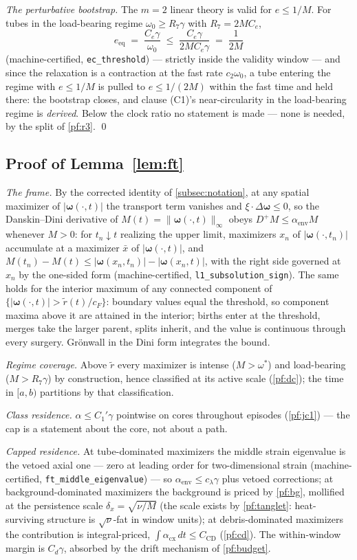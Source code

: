 \documentclass[11pt,letterpaper]{amsart}
\theoremstyle{definition}
\theoremstyle{remark}
\newcommand{\om}{\omega}
\newcommand{\vort}{\boldsymbol{\omega}}
\newcommand{\norm}[1]{\lVert #1 \rVert}
\newcommand{\abs}[1]{\lvert #1 \rvert}
\begin{document}
\emph{The perturbative bootstrap.} The $m=2$ linear theory is valid for
$e\le1/M$. For tubes in the load-bearing regime $\om_0\ge R_7\gamma$ with
$R_7=2MC_e$,
\[
e_{\mathrm{eq}}\;=\;\frac{C_e\gamma}{\om_0}\;\le\;\frac{C_e\gamma}{2MC_e\gamma}
\;=\;\frac{1}{2M}
\]
(machine-certified, \texttt{ec\_threshold}) --- strictly inside the validity window
--- and since the relaxation is a contraction at the fast rate $c_2\om_0$, a tube
entering the regime with $e\le1/M$ is pulled to $e\le1/(2M)$ within the fast time and
held there: the bootstrap closes, and clause (C1)'s near-circularity in the
load-bearing regime is \emph{derived}. Below the clock ratio no statement is made ---
none is needed, by the split of \cref{pf:r3}. \qed

\subsection{Proof of Lemma~\ref{lem:ft}}\label{pf:ft}
\emph{The frame.} By the corrected identity of \cref{subsec:notation}, at any
spatial maximizer of $\abs{\vort(\cdot,t)}$ the transport term vanishes and
$\xi\!\cdot\!\Delta\vort\le0$, so the Danskin--Dini derivative of
$M(t)=\norm{\vort(\cdot,t)}_\infty$ obeys $D^+M\le\alpha_{\mathrm{env}}M$ whenever
$M>0$: for $t_n\downarrow t$ realizing the upper limit, maximizers $x_n$ of
$\abs{\vort(\cdot,t_n)}$ accumulate at a maximizer $\bar x$ of
$\abs{\vort(\cdot,t)}$, and
$M(t_n)-M(t)\le\abs{\vort(x_n,t_n)}-\abs{\vort(x_n,t)}$, with the right side
governed at $x_n$ by the one-sided form (machine-certified,
\texttt{l1\_subsolution\_sign}). The same holds for the interior maximum of
any connected component of $\{\abs{\vort(\cdot,t)}>\tilde r(t)/c_F\}$: boundary
values equal the threshold, so component maxima above it are attained in the
interior; births enter at the threshold, merges take the larger parent, splits
inherit, and the value is continuous through every surgery. Gr\"onwall in the Dini
form integrates the bound.

\emph{Regime coverage.} Above $\tilde r$ every maximizer is intense ($M>\om^*$) and
load-bearing ($M>R_7\gamma$) by construction, hence classified at its active scale
(\cref{pf:dc}); the time in $[a,b)$ partitions by that classification.

\emph{Class residence.} $\alpha\le C_1'\gamma$ pointwise on cores throughout
episodes (\cref{pf:jc1}) --- the cap is a statement about the core, not about a
path.

\emph{Capped residence.} At tube-dominated maximizers the middle strain eigenvalue
is the vetoed axial one --- zero at leading order for two-dimensional strain
(machine-certified, \texttt{ft\_middle\_eigenvalue}) --- so
$\alpha_{\mathrm{env}}\le c_\lambda\gamma$ plus vetoed corrections; at
background-dominated maximizers the background is priced by \cref{pf:bg}, mollified
at the persistence scale $\delta_x=\sqrt{\nu/M}$ (the scale exists by
\cref{pf:tanglet}: heat-surviving structure is $\sqrt\nu$-fat in window units); at
debris-dominated maximizers the contribution is integral-priced,
$\int\alpha_{\mathrm{cx}}\,dt\le C_{\mathrm{CD}}$ (\cref{pf:cd}). The within-window
margin is $C_d\gamma$, absorbed by the drift mechanism of \cref{pf:budget}.
\end{document}
